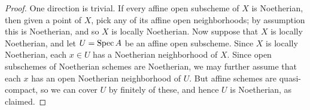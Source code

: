 \begin{proof}
	One direction is trivial. If every affine open subscheme of $X$ is Noetherian, then given a point of $X$, pick any of its affine open neighborhoods; by assumption this is Noetherian, and so $X$ is locally Noetherian. Now suppose that $X$ is locally Noetherian, and let $U = \operatorname{Spec} A$ be an affine open subscheme. Since $X$ is locally Noetherian, each $x \in U$ has a Noetherian neighborhood of $X$. Since open subschemes of Noetherian schemes are Noetherian, we may further assume that each $x$ has an open Noetherian neighborhood of $U$. But affine schemes are quasi-compact, so we can cover $U$ by finitely of these, and hence $U$ is Noetherian, as claimed.
\end{proof}

